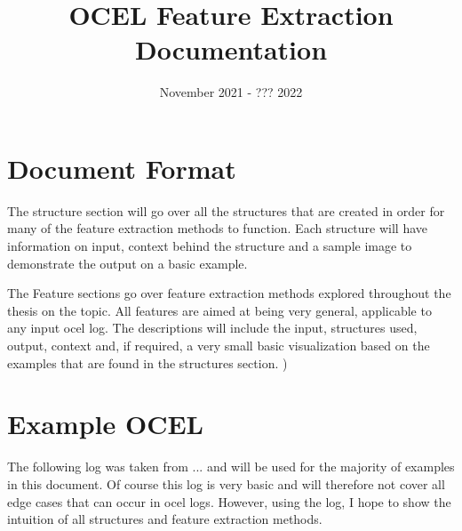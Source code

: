 \documentclass{article}
\title{OCEL Feature Extraction Documentation}
\date{November 2021 - ??? 2022}
\begin{document}
\maketitle

\tableofcontents
\pagebreak

\section{Document Format}
The structure section will go over all the structures that are created in order for many of the feature extraction methods to function. Each structure will have information on input, context behind the structure and a sample image to demonstrate the output on a basic example.

The Feature sections go over feature extraction methods explored throughout the thesis on the topic. All features are aimed at being very general, applicable to any input ocel log. The descriptions will include the input, structures used, output, context and, if required, a very small basic visualization based on the examples that are found in the structures section. 
)

\section{Example OCEL}
The following log was taken from ... and will be used for the majority of examples in this document. Of course this log is very basic and will therefore not cover all edge cases that can occur in ocel logs. However, using the log, I hope to show the intuition of all structures and feature extraction methods.
\end{document}
